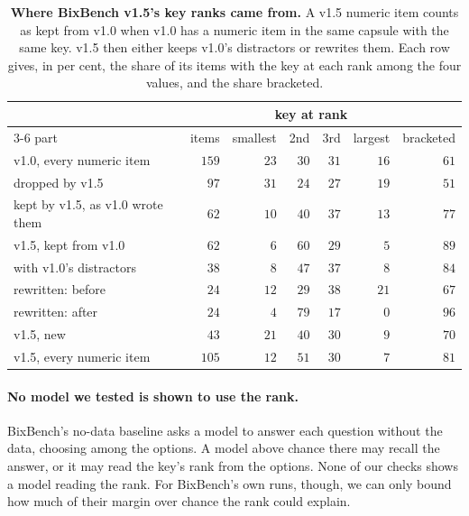 \documentclass{article}
\begin{document}
\begin{table}[htbp]
\centering\footnotesize\setlength{\tabcolsep}{4pt}
\caption{\textbf{Where BixBench v1.5's key ranks came from.} A v1.5 numeric item counts as kept from v1.0 when v1.0
has a numeric item in the same capsule with the same key. v1.5 then either keeps v1.0's distractors or rewrites them.
Each row gives, in per cent, the share of its items with the key at each rank among the four values, and the share
bracketed.}
\label{tab:origin}
\begin{tabular}{lrrrrrr}
\toprule
& & \multicolumn{4}{c}{key at rank} & \\
\cmidrule(lr){3-6}
part & items & smallest & 2nd & 3rd & largest & bracketed\\
\midrule
v1.0, every numeric item & $159$ & $23$ & $30$ & $31$ & $16$ & $61$\\
\quad dropped by v1.5 & $97$ & $31$ & $24$ & $27$ & $19$ & $51$\\
\quad kept by v1.5, as v1.0 wrote them & $62$ & $10$ & $40$ & $37$ & $13$ & $77$\\
v1.5, kept from v1.0 & $62$ & $6$ & $60$ & $29$ & $5$ & $89$\\
\quad with v1.0's distractors & $38$ & $8$ & $47$ & $37$ & $8$ & $84$\\
\quad rewritten: before & $24$ & $12$ & $29$ & $38$ & $21$ & $67$\\
\quad rewritten: after & $24$ & $4$ & $79$ & $17$ & $0$ & $96$\\
v1.5, new & $43$ & $21$ & $40$ & $30$ & $9$ & $70$\\
v1.5, every numeric item & $105$ & $12$ & $51$ & $30$ & $7$ & $81$\\
\bottomrule
\end{tabular}
\end{table}

\paragraph{No model we tested is shown to use the rank.} BixBench's no-data baseline asks a model to answer each
question without the data, choosing among the options. A model above chance there may recall the answer, or it may
read the key's rank from the options. None of our checks shows a model reading the rank. For BixBench's own runs,
though, we can only bound how much of their margin over chance the rank could explain.
\end{document}
